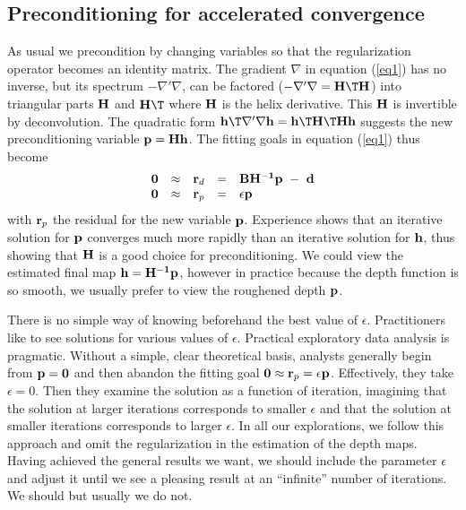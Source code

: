 \subsection{Preconditioning for accelerated convergence}

As usual we
precondition by changing variables so
that the regularization operator becomes an identity matrix.
The gradient $\nabla$ in equation (\ref{eq1}) has no inverse, but its
spectrum $-\nabla'\nabla$,
can be factored ($-\nabla'\nabla={\bf H\T H}$) into triangular parts 
${\bf H}$ and ${\bf H\T}$ where ${\bf H}$ is the helix derivative.
This ${\bf H}$ is invertible by deconvolution.
The quadratic form
$\bold h\T\nabla'\nabla\bold h = \bold h\T\bold H\T\bold H \bold h$
suggests the new preconditioning variable $\bold p = \bold H\bold h$.
The fitting goals in equation (\ref{eq1}) thus become
\begin{equation}
  \begin{array}{lllll}
    \bold 0 &\approx& \bold r_d &=& \bold B \bold {H^{-1}} \bold p \ -\  \bold d \\
    \bold 0 &\approx& \bold r_p &=& \epsilon \bold p
  \end{array} \label{eqn:eq2}
\end{equation}
with $\bold r_p$ the residual for the new variable ${\bf p}$.
Experience shows that an iterative solution for ${\bf p}$ converges much
more rapidly than an iterative solution for ${\bf h}$,
thus showing that ${\bf H}$ is a good choice for preconditioning. 
We could view the estimated final map ${\bf h}={\bf H^{-1}p}$,
however in practice because the depth function is so smooth,
we usually prefer to view the roughened depth $\bold p$.


\par
There is no simple way of knowing beforehand the best value of $\epsilon$.
Practitioners like to see solutions for various values of $\epsilon$.
Practical exploratory data analysis is pragmatic.
Without a simple, clear theoretical basis, analysts
generally begin from ${\bf p=0}$ and then abandon the fitting goal
$\bold 0 \approx  \bold r_p =\epsilon \bold p$.
Effectively, they take $\epsilon=0$.
Then they examine the solution as a function
of iteration, imagining that the solution at larger iterations
corresponds to smaller $\epsilon$ and that the solution at smaller iterations
corresponds to larger $\epsilon$.
In all our explorations, we follow this approach
and omit the regularization in the estimation of the depth maps.
Having achieved the general results we want,
we should include the parameter $\epsilon$ and adjust it until
we see a pleasing result at an ``infinite'' number of iterations.
We should but usually we do not.


